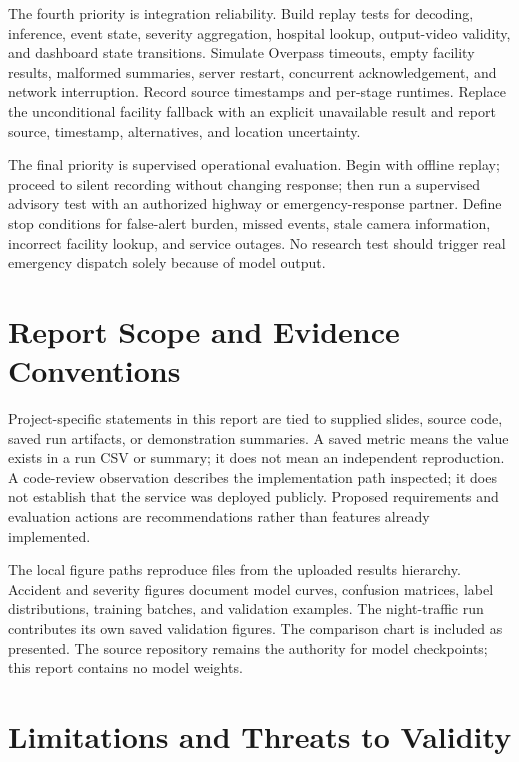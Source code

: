 \documentclass[12pt,a4paper]{article}
\begin{document}
The fourth priority is integration reliability. Build replay tests for decoding, inference, event state, severity aggregation, hospital lookup, output-video validity, and dashboard state transitions. Simulate Overpass timeouts, empty facility results, malformed summaries, server restart, concurrent acknowledgement, and network interruption. Record source timestamps and per-stage runtimes. Replace the unconditional facility fallback with an explicit unavailable result and report source, timestamp, alternatives, and location uncertainty.

The final priority is supervised operational evaluation. Begin with offline replay; proceed to silent recording without changing response; then run a supervised advisory test with an authorized highway or emergency-response partner. Define stop conditions for false-alert burden, missed events, stale camera information, incorrect facility lookup, and service outages. No research test should trigger real emergency dispatch solely because of model output.

\section{Report Scope and Evidence Conventions}
Project-specific statements in this report are tied to supplied slides, source code, saved run artifacts, or demonstration summaries. A saved metric means the value exists in a run CSV or summary; it does not mean an independent reproduction. A code-review observation describes the implementation path inspected; it does not establish that the service was deployed publicly. Proposed requirements and evaluation actions are recommendations rather than features already implemented.

The local figure paths reproduce files from the uploaded results hierarchy. Accident and severity figures document model curves, confusion matrices, label distributions, training batches, and validation examples. The night-traffic run contributes its own saved validation figures. The comparison chart is included as presented. The source repository remains the authority for model checkpoints; this report contains no model weights.
\section{Limitations and Threats to Validity}
\end{document}
